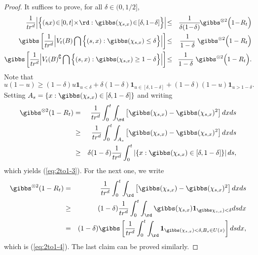 \begin{proof}
It suffices to prove, for all $\delta \in (0,1/2]$,
\begin{eqnarray}
\label{eq:2to1-3}
\frac{1}{tr^d}  \Big\vert  \Big\{(s\!,\!x)\! \in \![0,t]\!\times \!\rd: \gibbs(\chi_{s,x})\! \in \![\delta, 1\!-\!\delta]\Big\} \Big\vert  &\!\leq\!&
\frac{1}{\delta (1\!-\!\delta)} \!
{\gibbs}^{\otimes 2} \Big(1\!-\! R_t\Big)\\
 \label{eq:2to1-4}
\gibbs \left[ \frac{1}{tr^d}  \Big\vert  V_t(B) \bigcap \Big\{(s,x) : \gibbs(\chi_{s,x}) \leq \delta\Big\} 
\Big\vert  
\right]  &\!\leq\!&
\frac{1}{1-\delta} \;
 {\gibbs}^{\otimes 2} \Big(1- R_t\Big)\\
\label{eq:2to1-5}
\gibbs \left[ \frac{1}{tr^d}  \Big\vert  
V_t(B)^\complement   \bigcap 
 \Big\{(s,x) : \gibbs(\chi_{s,x}) \geq 1-\delta\Big\} 
  \Big\vert  
\right] &\!\leq\!&
\frac{1}{1-\delta} \;
 {\gibbs}^{\otimes 2} \Big(1- R_t\Big).
\end{eqnarray}
Note that
$$
u(1-u) \geq (1-\delta)u {\mathbf 1}_{u < \delta} + 
\delta (1-\delta) {\mathbf 1}_{u \in[\delta,1-\delta]} +(1-\delta)(1-u) {\mathbf 1}_{u > 1-\delta} .
$$
Setting $A_s=\{x : \gibbs(\chi_{s,x} )\in [\delta, 1-\delta]\}$ and writing
\begin{eqnarray*}
{\gibbs}^{\otimes 2} (1- R_t) &=& \frac{1}{tr^d} \int_0^t \int_{\rd} \left[ {\gibbs}( \chi_{s,x})- {\gibbs}( \chi_{s,x})^2\right] dx ds \\
&\geq &  \frac{1}{tr^d} \int_0^t \int_{A_s} \left[ {\gibbs}( \chi_{s,x})- {\gibbs}( \chi_{s,x})^2\right] dx ds \\
&\geq & 
\delta (1-\delta) 
\frac{1}{tr^d} \int_0^t \left| \{x : {\gibbs}(\chi_{s,x}) \in [\delta, 1-\delta]\} \right|
 ds, 
\end{eqnarray*}
which yields (\ref{eq:2to1-3}). For the next one, we write
\begin{eqnarray*}
{\gibbs}^{\otimes 2} (1- R_t) &=& \frac{1}{tr^d} \int_0^t \int_{\rd} \left[ {\gibbs}( \chi_{s,x})- {\gibbs}( \chi_{s,x})^2\right] dx ds \\
&\geq& (1-\delta) \frac{1}{tr^d} \int_0^t \int_{\rd}  {\gibbs}( \chi_{s,x})  {\mathbf 1}_{
 {\gibbs} \chi_{s,x})  < \delta} ds dx\\
 &=& (1-\delta) {\gibbs} \left[ \frac{1}{tr^d} \int_0^t \int_{\rd}   {\mathbf 1}_{
{\gibbs}( \chi_{s,x})  < \delta, B_s \in U(x)}   \right] ds dx,
\end{eqnarray*}
which is (\ref{eq:2to1-4}). The last claim can be proved similarly.
\end{proof} 
 
